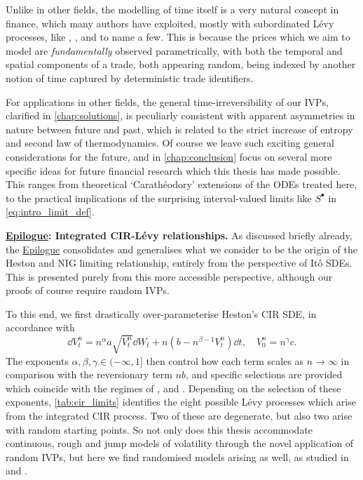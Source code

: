 Unlike in other fields, the modelling of time itself is a very natural concept in finance, which many authors have exploited, mostly with subordinated L\'evy processes, like \cite{barndorff-nielsen_2001a}, \cite{geman_2001}, and \cite{carr_2004} to name a few. This is because the prices which we aim to model are \emph{fundamentally} observed parametrically, with both the temporal and spatial components of a trade, both appearing random, being indexed by another notion of time captured by deterministic trade identifiers.

For applications in other fields, the general time-irreversibility of our IVPs, clarified in \autoref{chap:solutions}, is peculiarly consistent with apparent asymmetries in nature between future and past, which is related to the strict increase of entropy and second law of thermodynamics. Of course we leave such exciting general considerations for the future, and in \autoref{chap:conclusion} focus on several more specific ideas for future financial research which this thesis has made possible. This ranges from theoretical `Carath\'eodory' extensions of the ODEs treated here, to the practical implications of the surprising interval-valued limits like $S^\bullet$ in \autoref{eq:intro_limit_def}.

\vspace{3mm}\textbf{\hyperlink{epilogue}{Epilogue}: Integrated CIR-L\'evy relationships.} As discussed briefly already, the \hyperlink{epilogue}{Epilogue} consolidates and generalises what we consider to be the origin of the Heston and NIG limiting relationship, entirely from the perspective of It\^o SDEs. This is presented purely from this more accessible perspective, although our proofs of course require random IVPs.

To this end, we first drastically over-parameterise Heston's CIR SDE, in accordance with
\begin{equation}
    \dd V^n_t = n^\alpha a \sqrt{V^n_t}\dd W_t + n(b - n^{\beta-1} V^n_t)\dd t,\quad V^n_0=n^\gamma c.
\end{equation}
The exponents $\alpha,\beta,\gamma\in(-\infty,1]$ then control how each term scales as $n\to\infty$ in comparison with the reversionary term $nb$, and specific selections are provided which coincide with the regimes of \cite{heston_1993}, \cite{fouque_2011} and \cite{mechkov_2015}. Depending on the selection of these exponents, \autoref{tab:cir_limits} identifies the eight possible L\'evy processes which arise from the integrated CIR process. Two of these are degenerate, but also two arise with random starting points. So not only does this thesis accommodate continuous, rough and jump models of volatility through the novel application of random IVPs, but here we find randomised models arising as well, as studied in \cite{mechkov_2016} and \cite{jacquier_2019}.
